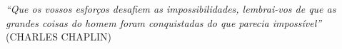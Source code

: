 \begin{epigrafe}
    \vspace*{\fill}
	\begin{flushright}
		\textit{``Que os vossos esforços desafiem as impossibilidades, lembrai-vos de que as \\
		grandes coisas do homem foram conquistadas do que parecia impossível''} \\
		(CHARLES CHAPLIN)
	\end{flushright}
\end{epigrafe}

